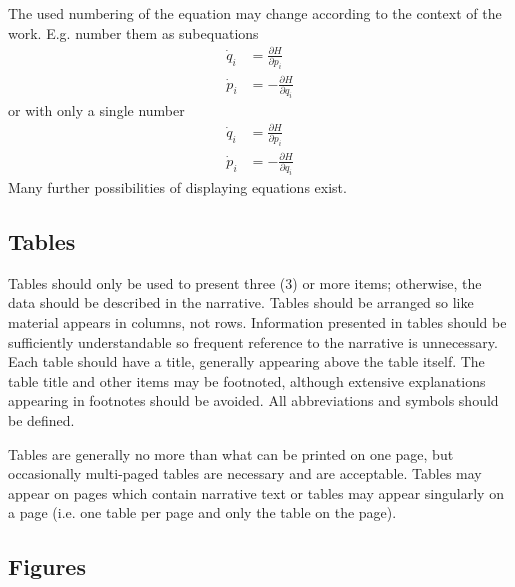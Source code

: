 The used numbering of the equation may change according to the context of the work. E.g. number them as subequations
\begin{subequations}
\begin{align}
  \dot{q}_i & = \frac{\partial H}{\partial p_i} \\
  \dot{p}_i & = -\frac{\partial H}{\partial q_i} 
\end{align}
\end{subequations}
or with only a single number
\begin{equation}
\begin{aligned}
  \dot{q}_i & = \frac{\partial H}{\partial p_i} \\
  \dot{p}_i & = -\frac{\partial H}{\partial q_i} 
\end{aligned}
\end{equation}
Many further possibilities of displaying equations exist.


\subsection*{Tables}
\label{sec:tables}

Tables should only be used to present three (3) or more items; otherwise, the data should be described in the narrative. Tables should be arranged so like material appears in columns, not rows. Information presented in tables should be sufficiently understandable so frequent reference to the narrative is unnecessary. Each table should have a title, generally appearing above the table itself. The table title and other items may be footnoted, although extensive explanations appearing in footnotes should be avoided. All abbreviations and symbols should be defined.

Tables are generally no more than what can be printed on one page, but occasionally multi-paged tables are necessary and are acceptable. Tables may appear on pages which contain narrative text or tables may appear singularly on a page (i.e. one table per page and only the table on the page).


\subsection*{Figures}
\label{sec:figures}

